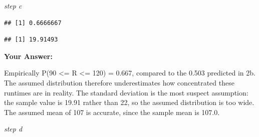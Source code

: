 \documentclass[
]{article}
\newenvironment{Shaded}{\begin{snugshade}}{\end{snugshade}}
\newcommand{\AttributeTok}[1]{\textcolor[rgb]{0.13,0.29,0.53}{#1}}
\newcommand{\ConstantTok}[1]{\textcolor[rgb]{0.56,0.35,0.01}{#1}}
\newcommand{\DecValTok}[1]{\textcolor[rgb]{0.00,0.00,0.81}{#1}}
\newcommand{\FunctionTok}[1]{\textcolor[rgb]{0.13,0.29,0.53}{\textbf{#1}}}
\newcommand{\NormalTok}[1]{#1}
\newcommand{\OtherTok}[1]{\textcolor[rgb]{0.56,0.35,0.01}{#1}}
\newcommand{\SpecialCharTok}[1]{\textcolor[rgb]{0.81,0.36,0.00}{\textbf{#1}}}
\newcommand{\StringTok}[1]{\textcolor[rgb]{0.31,0.60,0.02}{#1}}
\begin{document}
\emph{step c}

\begin{Shaded}
\end{Shaded}

\begin{verbatim}
## [1] 0.6666667
\end{verbatim}

\begin{Shaded}
\end{Shaded}

\begin{verbatim}
## [1] 19.91493
\end{verbatim}

\textbf{Your Answer:}

Empirically P(90 \textless= R \textless= 120) = 0.667, compared to the
0.503 predicted in 2b. The assumed distribution therefore underestimates
how concentrated these runtimes are in reality. The standard deviation
is the most suspect assumption: the sample value is 19.91 rather than
22, so the assumed distribution is too wide. The assumed mean of 107 is
accurate, since the sample mean is 107.0.

\emph{step d}

\begin{Shaded}
\end{Shaded}
\end{document}
